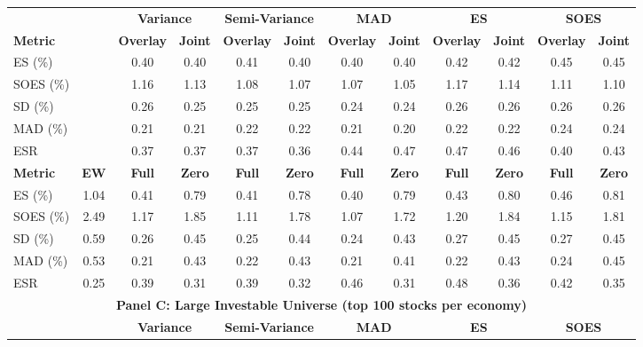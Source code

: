 \begin{table}[p]
{\begin{tabular}{l*{11}{c}}
    \midrule
    & & \multicolumn{2}{c}{\textbf{Variance}} & \multicolumn{2}{c}{\textbf{Semi-Variance}} & \multicolumn{2}{c}{\textbf{MAD}} & \multicolumn{2}{c}{\textbf{ES}} & \multicolumn{2}{c}{\textbf{SOES}} \\
    \cmidrule(lr){3-4} \cmidrule(lr){5-6} \cmidrule(lr){7-8} \cmidrule(lr){9-10} \cmidrule(lr){11-12}
    \textbf{Metric} &  & \textbf{Overlay} & \textbf{Joint} & \textbf{Overlay} & \textbf{Joint} & \textbf{Overlay} & \textbf{Joint} & \textbf{Overlay} & \textbf{Joint} & \textbf{Overlay} & \textbf{Joint} \\
    \midrule
    ES (\%) &  & 0.40 & 0.40 & 0.41 & 0.40 & 0.40 & 0.40 & 0.42 & 0.42 & 0.45 & 0.45 \\
    SOES (\%) &  & 1.16 & 1.13 & 1.08 & 1.07 & 1.07 & 1.05 & 1.17 & 1.14 & 1.11 & 1.10 \\
    SD (\%) &  & 0.26 & 0.25 & 0.25 & 0.25 & 0.24 & 0.24 & 0.26 & 0.26 & 0.26 & 0.26 \\
    MAD (\%) &  & 0.21 & 0.21 & 0.22 & 0.22 & 0.21 & 0.20 & 0.22 & 0.22 & 0.24 & 0.24 \\
    ESR &  & 0.37 & 0.37 & 0.37 & 0.36 & 0.44 & 0.47 & 0.47 & 0.46 & 0.40 & 0.43 \\
    \midrule
    \textbf{Metric} & \textbf{EW} & \textbf{Full} & \textbf{Zero} & \textbf{Full} & \textbf{Zero} & \textbf{Full} & \textbf{Zero} & \textbf{Full} & \textbf{Zero} & \textbf{Full} & \textbf{Zero} \\
    \midrule
    ES (\%) & 1.04 & 0.41 & 0.79 & 0.41 & 0.78 & 0.40 & 0.79 & 0.43 & 0.80 & 0.46 & 0.81 \\
    SOES (\%) & 2.49 & 1.17 & 1.85 & 1.11 & 1.78 & 1.07 & 1.72 & 1.20 & 1.84 & 1.15 & 1.81 \\
    SD (\%) & 0.59 & 0.26 & 0.45 & 0.25 & 0.44 & 0.24 & 0.43 & 0.27 & 0.45 & 0.27 & 0.45 \\
    MAD (\%) & 0.53 & 0.21 & 0.43 & 0.22 & 0.43 & 0.21 & 0.41 & 0.22 & 0.43 & 0.24 & 0.45 \\
    ESR & 0.25 & 0.39 & 0.31 & 0.39 & 0.32 & 0.46 & 0.31 & 0.48 & 0.36 & 0.42 & 0.35 \\
    \midrule
    \multicolumn{12}{c}{\textbf{Panel C: Large Investable Universe (top 100 stocks per economy)}} \\
    \midrule
    & & \multicolumn{2}{c}{\textbf{Variance}} & \multicolumn{2}{c}{\textbf{Semi-Variance}} & \multicolumn{2}{c}{\textbf{MAD}} & \multicolumn{2}{c}{\textbf{ES}} & \multicolumn{2}{c}{\textbf{SOES}} \\
    \cmidrule(lr){3-4} \cmidrule(lr){5-6} \cmidrule(lr){7-8} \cmidrule(lr){9-10} \cmidrule(lr){11-12}

\end{tabular}}
\end{table}

